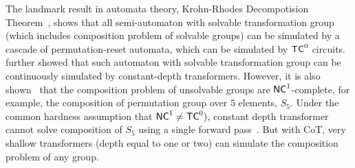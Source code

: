 The landmark result in automata theory, Krohn-Rhodes Decompotision Theorem~\citep{krohn1965algebraic}, shows that all semi-automaton with solvable transformation group (which includes composition problem of solvable groups) can be simulated by a cascade of permutation-reset automata, which can be simulated by $\mathsf{TC}^0$ circuits. \citep{liu2022transformers} further showed that such automaton with solvable transformation group can be continuously simulated by constant-depth transformers. However, it is also shown~\citep{barrington1986bounded} that the composition problem of unsolvable groups are $\mathsf{NC}^1$-complete, for example, the composition of permutation group over $5$ elements, $S_5$. Under the common hardness assumption that $\mathsf{NC}^1\neq \mathsf{TC}^0)$,   constant depth transformer cannot solve composition of $S_5$ using a single forward pass~\citep{merrill2023parallelism,liu2022transformers,li2024chain}. But with CoT, very shallow transformers (depth equal to one or two) can simulate the composition problem of any group\citep{li2024chain,merrill2023expresssive}.



